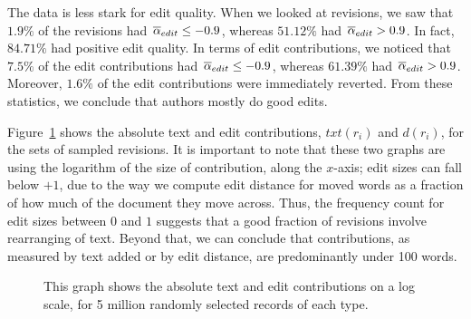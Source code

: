 The data is less stark for edit quality.
When we looked at revisions, we saw that $1.9\%$ of the revisions
had ${\overline{\alpha}}_{edit} \le -0.9$, whereas $51.12\%$ had
${\overline{\alpha}}_{edit} > 0.9$.
In fact, $84.71\%$ had positive edit quality.
In terms of edit contributions, we noticed that $7.5\%$ of the
edit contributions had ${\overline{\alpha}}_{edit} \le -0.9$, whereas
$61.39\%$ had ${\overline{\alpha}}_{edit} > 0.9$.
Moreover, $1.6\%$ of the edit contributions were immediately
reverted.
From these statistics, we conclude that authors mostly do good
edits.

Figure~\ref{fig-revs-contrib} shows the absolute text and edit 
contributions, $txt(r_i)$ and $d(r_i)$, for the sets of sampled revisions.
It is important to note that these two graphs are using
the logarithm of the size of contribution, along the $x$-axis;
edit sizes can fall below $+1$, due to the way we compute
edit distance for moved words as a fraction of how much of
the document they move across.
Thus, the frequency count for edit sizes between $0$ and $1$
suggests that a good fraction of revisions involve rearranging
of text.
Beyond that, we can conclude that contributions, as measured
by text added or by edit distance, are predominantly under
100 words.
%
\begin{figure}[t]
    \begin{center}
    \end{center}
    \caption[Measuring total edit and text contribution over revisions]{
        This graph shows the absolute text and edit contributions 
        on a log scale, for 5 million randomly selected records
	of each type.
    }
    \label{fig-revs-contrib}
\end{figure}
%

